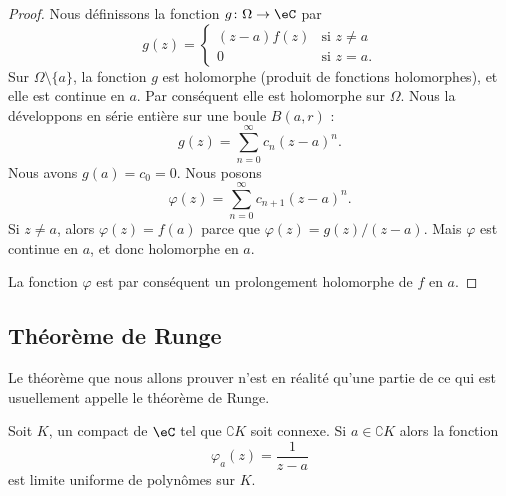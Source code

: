 \begin{proof}
	Nous définissons la fonction \( g\colon \Omega\to \eC\) par
	\begin{equation}
		g(z)=\begin{cases}
			(z-a)f(z) & \text{si } z\neq a \\
			0         & \text{si } z=a.
		\end{cases}
	\end{equation}
	Sur \( \Omega\setminus\{ a \}\), la fonction \( g\) est holomorphe (produit de fonctions holomorphes), et elle est continue en \( a\). Par conséquent elle est holomorphe sur \( \Omega\). Nous la développons en série entière sur une boule \( B(a,r)\) :
	\begin{equation}
		g(z)=\sum_{n=0}^{\infty}c_n(z-a)^n.
	\end{equation}
	Nous avons \( g(a)=c_0=0\). Nous posons
	\begin{equation}
		\varphi(z)=\sum_{n=0}^{\infty}c_{n+1}(z-a)^n.
	\end{equation}
	Si \( z\neq a\), alors \( \varphi(z)=f(a)\) parce que \( \varphi(z)=g(z)/(z-a)\). Mais \( \varphi\) est continue en \( a\), et donc holomorphe en \( a\).

	La fonction \( \varphi\) est par conséquent un prolongement holomorphe de \( f\) en \( a\).
\end{proof}

\subsection{Théorème de Runge}

Le théorème que nous allons prouver n'est en réalité qu'une partie de ce qui est usuellement appelle le théorème de Runge.
\begin{theorem}     \label{ThoMvMCci}
	Soit \( K\), un compact de \( \eC\) tel que \( \complement K\) soit connexe. Si \( a\in \complement K\) alors la fonction
	\begin{equation}
		\varphi_a(z)=\frac{1}{ z-a }
	\end{equation}
	est limite uniforme de polynômes sur \( K\).
\end{theorem}

